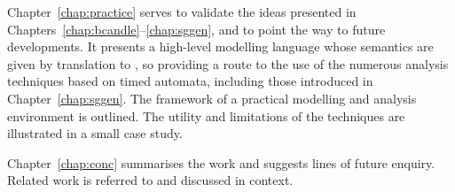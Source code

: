 Chapter~\ref{chap:practice} serves to validate the ideas 
presented in Chapters~\ref{chap:bcandle}--\ref{chap:sggen}, and to
point the way to future developments. It presents a high-level
modelling language whose semantics are given by translation to
\bcandle, so providing a route to the use of the numerous analysis 
techniques based on timed automata, including those introduced in
Chapter~\ref{chap:sggen}. The framework
of a practical modelling and analysis environment is outlined. The
utility and limitations of the techniques are illustrated in a small
case study.

Chapter~\ref{chap:conc} summarises the work and suggests lines of
future enquiry. Related work is referred to and discussed in context.












